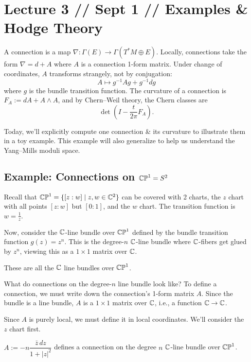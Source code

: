 \documentclass[main]{subfiles}
\begin{document}
\section*{Lecture 3 // Sept 1 // Examples \& Hodge Theory}

\begin{recall}
A connection is a map $\nabla : \Gamma(E) \to \Gamma(T^\ast M \oplus E)$. Locally, connections take the form $\nabla = d+A$ where $A$ is a connection 1-form matrix. Under change of coordinates, $A$ transforms strangely, not by conjugation:
\[
A \mapsto g^{-1}Ag + g^{-1}dg
\]
where $g$ is the bundle transition function. The curvature of a connection is $F_A := dA + A\wedge A$, and by Chern--Weil theory, the Chern classes are
\[
\det\!\left(I - \frac{t}{2\pi}F_A\right).
\]

\noindent Today, we'll explicitly compute one connection \& its curvature to illustrate them in a toy example. This example will also generalize to help us understand the Yang--Mills moduli space.
\end{recall}

\subsection*{Example: Connections on $\mathbb{CP}^1 = S^2$}

Recall that $\mathbb{CP}^1 = \{[z:w] \mid z,w \in \mathbb C^2\}$ can be covered with 2 charts, the $z$ chart with all points $[z:w]$ but $[0:1]$, and the $w$ chart. The transition function is $w = \frac{1}{z}$.

Now, consider the $\mathbb C$-line bundle over $\mathbb{CP}^1$ defined by the bundle transition function $g(z) = z^n$. This is the degree-$n$ $\mathbb C$-line bundle where $\mathbb C$-fibers get glued by $z^n$, viewing this as a $1\times 1$ matrix over $\mathbb C$.

\begin{fact}
These are all the $\mathbb C$ line bundles over $\mathbb{CP}^1$.
\end{fact}

What do connections on the degree-$n$ line bundle look like? To define a connection, we must write down the connection's 1-form matrix $A$. Since the bundle is a line bundle, $A$ is a $1\times 1$ matrix over $\mathbb C$, i.e., a function $\mathbb C \to \mathbb C$.

Since $A$ is purely local, we must define it in local coordinates. We'll consider the $z$ chart first.

\begin{proposition}
$A := -n\dfrac{\bar z\, dz}{1+|z|^2}$ defines a connection on the degree $n$ $\mathbb C$-line bundle over $\mathbb{CP}^1$.
\end{proposition}
\end{document}

